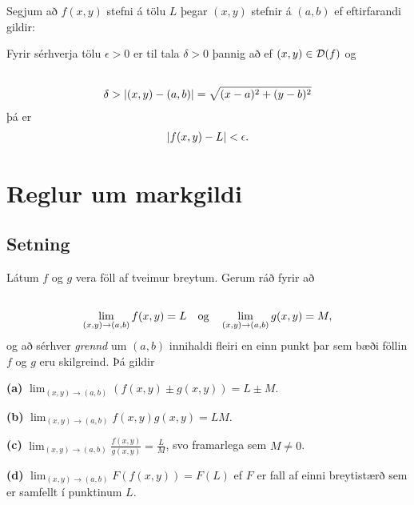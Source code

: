 \documentclass[a4paper,10pt,icelandic]{sphinxmanual}
\begin{document}
Segjum að \(f(x,y)\) stefni á tölu \(L\) þegar \((x,y)\)
stefnir á \((a,b)\) ef eftirfarandi gildir:

Fyrir sérhverja tölu \(\epsilon>0\) er til tala \(\delta>0\)
þannig að ef \((x,y)\in{\cal D}(f)\) og
\begin{gather}
\begin{split}\displaystyle\end{split}\notag\\\begin{split}\delta > |(x,y)-(a,b)| = \sqrt{(x-a)^2+(y-b)^2}\end{split}\notag
\end{gather}
þá er
\begin{gather}
\begin{split}\displaystyle
|f(x,y)-L|<\epsilon.\end{split}\notag
\end{gather}

\section{Reglur um markgildi}
\label{Kafli2:reglur-um-markgildi}

\subsection{Setning}
\label{Kafli2:setning}
Látum \(f\) og \(g\) vera föll af tveimur breytum. Gerum ráð
fyrir að
\begin{gather}
\begin{split}\displaystyle\end{split}\notag\\\begin{split}\lim_{(x,y)\rightarrow (a,b)}f(x,y)=L\quad\mbox{og}\quad
\lim_{(x,y)\rightarrow (a,b)}g(x,y)=M,\end{split}\notag
\end{gather}
og að sérhver \textit{grennd} um \((a,b)\) innihaldi fleiri en einn punkt þar
sem bæði föllin \(f\) og \(g\) eru skilgreind. Þá gildir

\textbf{(a)} \(\lim_{(x,y)\rightarrow (a,b)}(f(x,y)\pm g(x,y))=L\pm M\).

\textbf{(b)} \(\lim_{(x,y)\rightarrow (a,b)}f(x,y) g(x,y)=LM\).

\textbf{(c)} \(\lim_{(x,y)\rightarrow (a,b)}\frac{f(x,y)}{g(x,y)}=
\frac{L}{M}\), svo framarlega sem \(M\neq 0\).

\textbf{(d)} \(\lim_{(x,y)\rightarrow (a,b)}F(f(x,y))=F(L)\) ef \(F\)
er fall af einni breytistærð sem er samfellt í punktinum \(L\).
\end{document}
